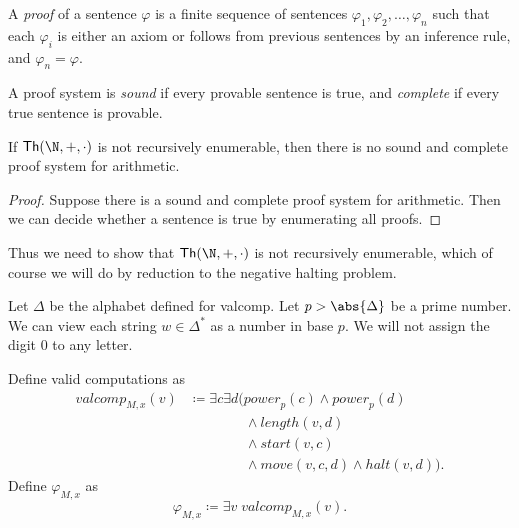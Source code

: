 \begin{definition}[Proofs] \label{def:proofs}
    A \emph{proof} of a sentence $\varphi$ is a finite sequence of
    sentences $\varphi_1, \varphi_2, \dots, \varphi_n$ such that
    each $\varphi_i$ is either an axiom or follows from previous
    sentences by an inference rule, and $\varphi_n = \varphi$.
\end{definition}

\begin{definition*} \label{def:peano:sound}
    A proof system is \emph{sound} if every provable sentence is true,
    and \emph{complete} if every true sentence is provable.
\end{definition*}

\begin{lemma}
    If $\Th(\N, +, \cdot)$ is not recursively enumerable,
    then there is no sound and complete proof system for arithmetic.
\end{lemma}
\begin{proof}
    Suppose there is a sound and complete proof system for arithmetic.
    Then we can decide whether a sentence is true by enumerating all
    proofs.
\end{proof}

Thus we need to show that $\Th(\N, +, \cdot)$ is not recursively enumerable,
which of course we will do by reduction to the negative halting problem.

Let $\Delta$ be the alphabet defined for valcomp.
Let $p > \abs{\Delta}$ be a prime number.
We can view each string $w \in \Delta^*$ as a number in base $p$.
We will not assign the digit $0$ to any letter.

Define valid computations as \begin{align*}
    \mathit{valcomp}_{M, x}(v)
    &\coloneq \exists c \exists d \big(
        \mathit{power}_p(c) \land \mathit{power}_p(d) \\
        &\qquad\qquad\land \mathit{length}(v, d) \\
        &\qquad\qquad\land \mathit{start}(v, c) \\
        &\qquad\qquad\land \mathit{move}(v, c, d) \land \mathit{halt}(v, d)
    \big).
\end{align*} Define $\varphi_{M, x}$ as \[
    \varphi_{M, x} \coloneq \exists v\; \mathit{valcomp}_{M, x}(v).
\]
